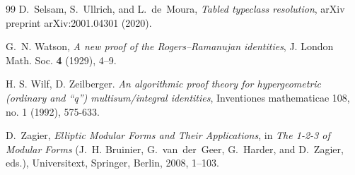 \documentclass[12pt]{amsart}
\theoremstyle{definition}
\theoremstyle{remark}
\numberwithin{equation}{subsection}
\begin{document}
\begin{thebibliography}{99}
D.~Selsam, S.~Ullrich, and L.~de~Moura, \emph{Tabled typeclass resolution}, arXiv preprint arXiv:2001.04301 (2020).



G.~N. Watson, \emph{A new proof of the Rogers--Ramanujan identities}, J. London Math. Soc. \textbf{4} (1929), 4--9.



H. S. Wilf, D. Zeilberger. \emph{An algorithmic proof theory for hypergeometric (ordinary and “q”) multisum/integral identities}, Inventiones mathematicae 108, no. 1 (1992), 575-633.


D.~Zagier, \emph{Elliptic Modular Forms and Their Applications}, in \emph{The 1-2-3 of Modular Forms} (J.~H. Bruinier, G.~van~der~Geer, G.~Harder, and D.~Zagier, eds.), Universitext, Springer, Berlin, 2008, 1--103.


\end{thebibliography}
\end{document}

